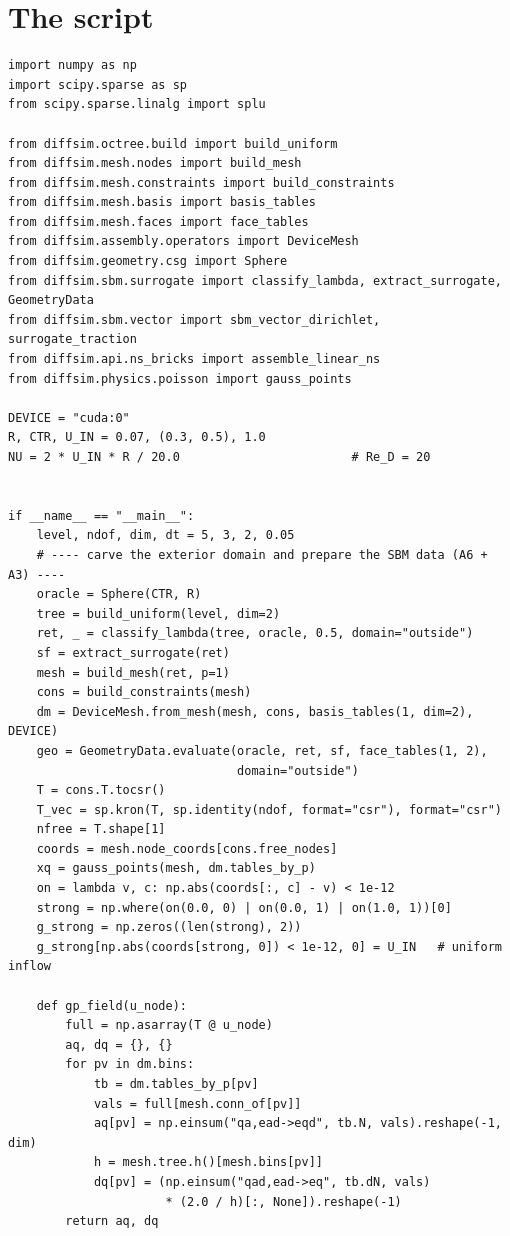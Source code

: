 \section*{The script}
\begin{lstlisting}
import numpy as np
import scipy.sparse as sp
from scipy.sparse.linalg import splu

from diffsim.octree.build import build_uniform
from diffsim.mesh.nodes import build_mesh
from diffsim.mesh.constraints import build_constraints
from diffsim.mesh.basis import basis_tables
from diffsim.mesh.faces import face_tables
from diffsim.assembly.operators import DeviceMesh
from diffsim.geometry.csg import Sphere
from diffsim.sbm.surrogate import classify_lambda, extract_surrogate, GeometryData
from diffsim.sbm.vector import sbm_vector_dirichlet, surrogate_traction
from diffsim.api.ns_bricks import assemble_linear_ns
from diffsim.physics.poisson import gauss_points

DEVICE = "cuda:0"
R, CTR, U_IN = 0.07, (0.3, 0.5), 1.0
NU = 2 * U_IN * R / 20.0                        # Re_D = 20


if __name__ == "__main__":
    level, ndof, dim, dt = 5, 3, 2, 0.05
    # ---- carve the exterior domain and prepare the SBM data (A6 + A3) ----
    oracle = Sphere(CTR, R)
    tree = build_uniform(level, dim=2)
    ret, _ = classify_lambda(tree, oracle, 0.5, domain="outside")
    sf = extract_surrogate(ret)
    mesh = build_mesh(ret, p=1)
    cons = build_constraints(mesh)
    dm = DeviceMesh.from_mesh(mesh, cons, basis_tables(1, dim=2), DEVICE)
    geo = GeometryData.evaluate(oracle, ret, sf, face_tables(1, 2),
                                domain="outside")
    T = cons.T.tocsr()
    T_vec = sp.kron(T, sp.identity(ndof, format="csr"), format="csr")
    nfree = T.shape[1]
    coords = mesh.node_coords[cons.free_nodes]
    xq = gauss_points(mesh, dm.tables_by_p)
    on = lambda v, c: np.abs(coords[:, c] - v) < 1e-12
    strong = np.where(on(0.0, 0) | on(0.0, 1) | on(1.0, 1))[0]
    g_strong = np.zeros((len(strong), 2))
    g_strong[np.abs(coords[strong, 0]) < 1e-12, 0] = U_IN   # uniform inflow

    def gp_field(u_node):
        full = np.asarray(T @ u_node)
        aq, dq = {}, {}
        for pv in dm.bins:
            tb = dm.tables_by_p[pv]
            vals = full[mesh.conn_of[pv]]
            aq[pv] = np.einsum("qa,ead->eqd", tb.N, vals).reshape(-1, dim)
            h = mesh.tree.h()[mesh.bins[pv]]
            dq[pv] = (np.einsum("qad,ead->eq", tb.dN, vals)
                      * (2.0 / h)[:, None]).reshape(-1)
        return aq, dq


\end{lstlisting}
